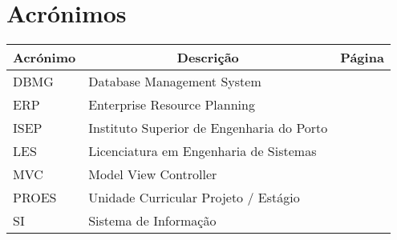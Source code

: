 

\chapter[Acrónimos]{Acrónimos}

\begin{center}
\small
\begin{longtable}{lp{3.0in}c}
\toprule \multicolumn{1}{c}{Acrónimo} 
                & \multicolumn{1}{c}{Descrição}
                                & \multicolumn{1}{c}{Página}\\ \midrule\addlinespace[2pt] \endhead

\bottomrule\endfoot

DBMG	& Database Management System			& \pageref{sym:DBMG}\\
ERP		& Enterprise Resource Planning			& \pageref{sym:ERP}\\
ISEP	& Instituto Superior de Engenharia do Porto
												& \\
LES		& Licenciatura em Engenharia de Sistemas
												& \\
MVC		& Model View Controller					& \pageref{sym:MVC}\\
PROES	& Unidade Curricular Projeto / Estágio	& \pageref{sym:PROES}\\
SI		& Sistema de Informação					& \pageref{sym:SI}\\


\end{longtable}

\end{center}

